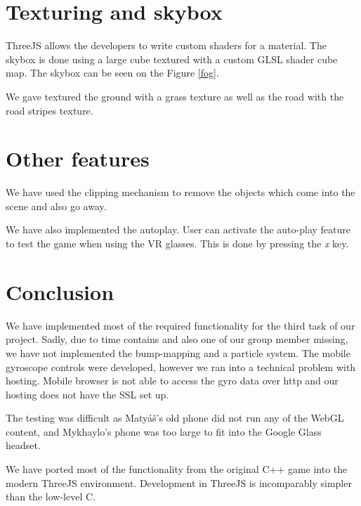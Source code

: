\documentclass[a4paper,10pt, twocolumn]{article}
\begin{document}
\section{Texturing and skybox}
ThreeJS allows the developers to write custom shaders for a material. The skybox is done using a large cube textured with a custom GLSL shader cube map. The skybox can be seen on the Figure \ref{fog}.

We gave textured the ground with a grass texture as well as the road with the road stripes texture.

\section{Other features}
We have used the clipping mechanism to remove the objects which come into the scene and also go away. 

We have also implemented the autoplay. User can activate the auto-play feature to test the game when using the VR glasses. This is done by pressing the \emph{x} key.

\section*{Conclusion}
We have implemented most of the required functionality for the third task of our project. Sadly, due to time contains and also one of our group member missing, we have not implemented the bump-mapping and a particle system. The mobile gyroscope controls were developed, however we ran into a technical problem  with hosting. Mobile browser is not able to access the gyro data over http and our hosting does not have the SSL set up. 

The testing was difficult as Matyáš's old phone did not run any of the WebGL content, and Mykhaylo's phone was too large to fit into the Google Glass headset. 

We have ported most of the functionality from the original C++ game into the modern ThreeJS environment. Development in ThreeJS is incomparably simpler than the low-level C. 
\end{document}

